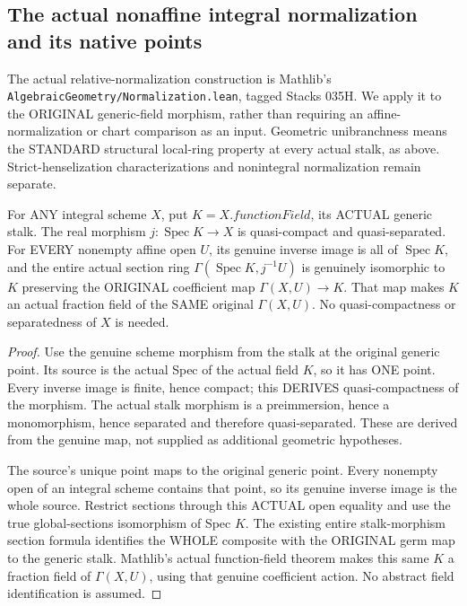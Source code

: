 \subsection{The actual nonaffine integral normalization and its native points}

The actual relative-normalization construction is Mathlib's
\texttt{AlgebraicGeometry/Normalization.lean}, tagged Stacks 035H.
We apply it to the ORIGINAL generic-field morphism, rather than
requiring an affine-normalization or chart comparison as an input.
Geometric unibranchness means the STANDARD structural local-ring
property at every actual stalk, as above. Strict-henselization
characterizations and nonintegral normalization remain separate.

\begin{theorem}
\label{scheme:actual-integral-generic-normalization-input}
For ANY integral scheme $X$, put $K=X.functionField$, its ACTUAL
generic stalk. The real morphism
$j:\operatorname{Spec}K\to X$ is quasi-compact and quasi-separated.
For EVERY nonempty affine open $U$, its genuine inverse image is
all of $\operatorname{Spec}K$, and the entire actual section ring
$\Gamma(\operatorname{Spec}K,j^{-1}U)$ is genuinely isomorphic to
$K$ preserving the ORIGINAL coefficient map $\Gamma(X,U)\to K$.
That map makes $K$ an actual fraction field of the SAME original
$\Gamma(X,U)$. No quasi-compactness or separatedness of $X$ is needed.
\leanok
\end{theorem}
\begin{proof}
Use the genuine scheme morphism from the stalk at the original
generic point. Its source is the actual Spec of the actual field
$K$, so it has ONE point. Every inverse image is finite, hence
compact; this DERIVES quasi-compactness of the morphism. The actual
stalk morphism is a preimmersion, hence a monomorphism, hence
separated and therefore quasi-separated. These are derived from
the genuine map, not supplied as additional geometric hypotheses.

The source's unique point maps to the original generic point.
Every nonempty open of an integral scheme contains that point,
so its genuine inverse image is the whole source. Restrict sections
through this ACTUAL open equality and use the true global-sections
isomorphism of Spec $K$. The existing entire stalk-morphism section
formula identifies the WHOLE composite with the ORIGINAL germ map
to the generic stalk. Mathlib's actual function-field theorem makes
this same $K$ a fraction field of $\Gamma(X,U)$, using that genuine
coefficient action. No abstract field identification is assumed.
\end{proof}

